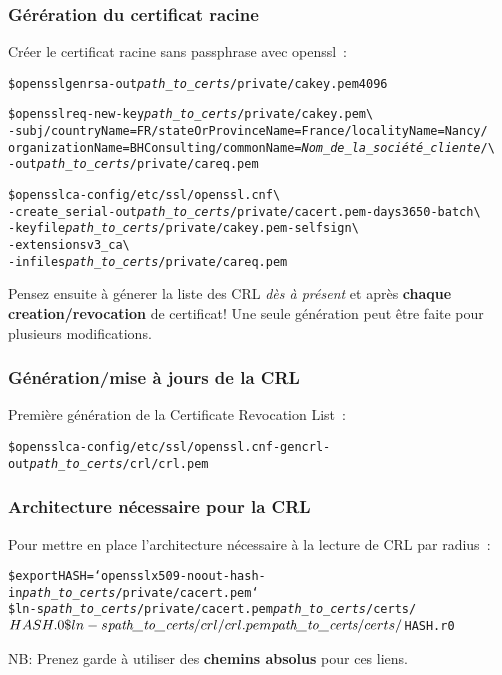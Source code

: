 \subsubsection{Gérération du certificat racine}

Créer le certificat racine sans passphrase avec openssl~:
\begin{alltt}
\$ openssl genrsa -out \emph{path\_to\_certs}/private/cakey.pem 4096 

\$ openssl req -new -key \emph{path\_to\_certs}/private/cakey.pem \textbackslash\\
	-subj /countryName=FR/stateOrProvinceName=France/localityName=Nancy/\\organizationName=BHConsulting/commonName=\emph{Nom\_de\_la\_société\_cliente}/ \textbackslash\\
	-out \emph{path\_to\_certs}/private/careq.pem


\$ openssl ca -config /etc/ssl/openssl.cnf \textbackslash\\
	-create\_serial -out \emph{path\_to\_certs}/private/cacert.pem -days 3650 -batch \textbackslash\\
	-keyfile \emph{path\_to\_certs}/private/cakey.pem -selfsign \textbackslash\\
	-extensions v3\_ca \textbackslash\\
	-infiles \emph{path\_to\_certs}/private/careq.pem
\end{alltt}

Pensez ensuite à génerer la liste des CRL \emph{dès à présent} et après \textbf{chaque creation/revocation} de certificat! Une seule génération peut être faite pour plusieurs modifications. 

\subsubsection{Génération/mise à jours de la CRL}
Première génération de la Certificate Revocation List~:
\begin{alltt}
\$ openssl ca -config /etc/ssl/openssl.cnf -gencrl -out \emph{path\_to\_certs}/crl/crl.pem
\end{alltt}

\subsubsection{Architecture nécessaire pour la CRL}

Pour mettre en place l'architecture nécessaire à la lecture de CRL par radius~:
\begin{alltt}

\$ export HASH=`openssl x509 -noout -hash -in \emph{path\_to\_certs}/private/cacert.pem`
\$ ln -s \emph{path\_to\_certs}/private/cacert.pem \emph{path\_to\_certs}/certs/$HASH.0
\$ ln -s \emph{path\_to\_certs}/crl/crl.pem \emph{path\_to\_certs}/certs/$HASH.r0

\end{alltt}
NB: Prenez garde à utiliser des \textbf{chemins absolus} pour ces liens.



